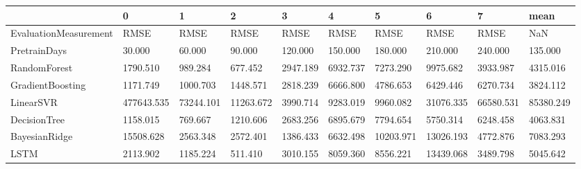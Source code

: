 \begin{tabular}{llllllllll}
\toprule
{} &          0 &         1 &         2 &        3 &        4 &         5 &         6 &         7 &      mean \\
\midrule
EvaluationMeasurement &       RMSE &      RMSE &      RMSE &     RMSE &     RMSE &      RMSE &      RMSE &      RMSE &       NaN \\
PretrainDays          &     30.000 &    60.000 &    90.000 &  120.000 &  150.000 &   180.000 &   210.000 &   240.000 &   135.000 \\
RandomForest          &   1790.510 &   989.284 &   677.452 & 2947.189 & 6932.737 &  7273.290 &  9975.682 &  3933.987 &  4315.016 \\
GradientBoosting      &   1171.749 &  1000.703 &  1448.571 & 2818.239 & 6666.800 &  4786.653 &  6429.446 &  6270.734 &  3824.112 \\
LinearSVR             & 477643.535 & 73244.101 & 11263.672 & 3990.714 & 9283.019 &  9960.082 & 31076.335 & 66580.531 & 85380.249 \\
DecisionTree          &   1158.015 &   769.667 &  1210.606 & 2683.256 & 6895.679 &  7794.654 &  5750.314 &  6248.458 &  4063.831 \\
BayesianRidge         &  15508.628 &  2563.348 &  2572.401 & 1386.433 & 6632.498 & 10203.971 & 13026.193 &  4772.876 &  7083.293 \\
LSTM                  &   2113.902 &  1185.224 &   511.410 & 3010.155 & 8059.360 &  8556.221 & 13439.068 &  3489.798 &  5045.642 \\
\bottomrule
\end{tabular}
